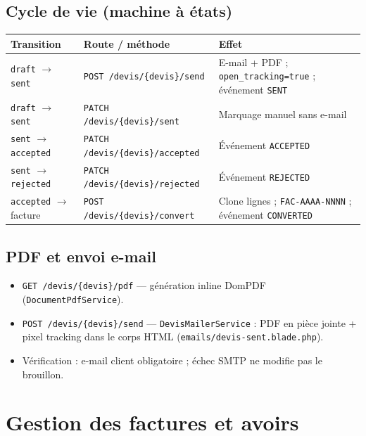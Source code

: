 \documentclass[11pt,a4paper]{report}
\newcommand{\route}[1]{\texttt{\small #1}}
\newcommand{\svc}[1]{\texttt{\small #1}}
\begin{document}
\subsection{Cycle de vie (machine à états)}

\begin{center}
\begin{tabular}{@{}lll@{}}
\toprule
\textbf{Transition} & \textbf{Route / méthode} & \textbf{Effet} \\
\midrule
\texttt{draft} $\rightarrow$ \texttt{sent} & \route{POST /devis/\{devis\}/send} & E-mail + PDF ; \texttt{open\_tracking=true} ; événement \texttt{SENT} \\
\texttt{draft} $\rightarrow$ \texttt{sent} & \route{PATCH /devis/\{devis\}/sent} & Marquage manuel sans e-mail \\
\texttt{sent} $\rightarrow$ \texttt{accepted} & \route{PATCH /devis/\{devis\}/accepted} & Événement \texttt{ACCEPTED} \\
\texttt{sent} $\rightarrow$ \texttt{rejected} & \route{PATCH /devis/\{devis\}/rejected} & Événement \texttt{REJECTED} \\
\texttt{accepted} $\rightarrow$ facture & \route{POST /devis/\{devis\}/convert} & Clone lignes ; \texttt{FAC-AAAA-NNNN} ; événement \texttt{CONVERTED} \\
\bottomrule
\end{tabular}
\end{center}

\subsection{PDF et envoi e-mail}

\begin{itemize}[leftmargin=*]
    \item \route{GET /devis/\{devis\}/pdf} — génération inline DomPDF (\svc{DocumentPdfService}).
    \item \route{POST /devis/\{devis\}/send} — \svc{DevisMailerService} : PDF en pièce jointe + pixel tracking dans le corps HTML (\texttt{emails/devis-sent.blade.php}).
    \item Vérification : e-mail client obligatoire ; échec SMTP ne modifie pas le brouillon.
\end{itemize}

\section{Gestion des factures et avoirs}
\end{document}
